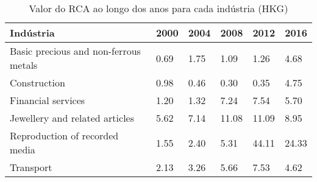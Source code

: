 \begin{table}
\centering
\caption{Valor do RCA ao longo dos anos para cada indústria (HKG)}
\label{tab:ex3-tempo-HKG}
\begin{tabular}{p{6cm}p{1.5cm}p{1.5cm}p{1.5cm}p{1.5cm}p{1.5cm}}
\toprule
                            Indústria & 2000 & 2004 &  2008 &  2012 &  2016 \\
\midrule
Basic precious and non-ferrous metals & 0.69 & 1.75 &  1.09 &  1.26 &  4.68 \\
                         Construction & 0.98 & 0.46 &  0.30 &  0.35 &  4.75 \\
                   Financial services & 1.20 & 1.32 &  7.24 &  7.54 &  5.70 \\
       Jewellery and related articles & 5.62 & 7.14 & 11.08 & 11.09 &  8.95 \\
       Reproduction of recorded media & 1.55 & 2.40 &  5.31 & 44.11 & 24.33 \\
                            Transport & 2.13 & 3.26 &  5.66 &  7.53 &  4.62 \\
\bottomrule
\end{tabular}
\end{table}
